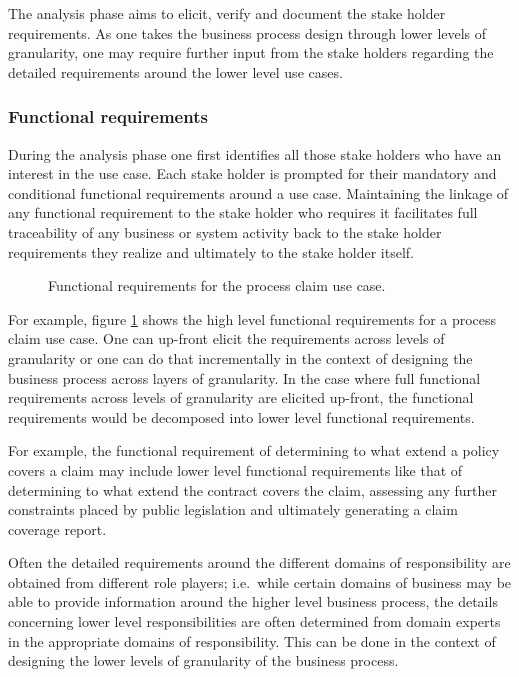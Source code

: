 \documentclass{IOS-Book-Article}
\begin{document}
The analysis phase aims to elicit, verify and document the stake holder requirements. As one takes the business
process design through lower levels of granularity, one may require further input from the stake holders regarding
the detailed requirements around the lower level use cases.


\subsubsection{Functional requirements}

During the analysis phase one first identifies all those stake holders who have an interest in the use case.
Each stake holder is prompted for their mandatory and conditional functional requirements around a use case.
Maintaining the linkage of any functional requirement to the stake holder who requires it facilitates full traceability
of any business or system activity back to the stake holder requirements they realize and ultimately to the 
stake holder itself.

\begin{figure}[thb]
  \centering
  \caption{Functional requirements for the process claim use case.}
  \label{fig:processClaimUseCase}
\end{figure}

For example, figure \ref{fig:processClaimUseCase} shows the high level functional requirements for a process
claim use case. One can up-front elicit the requirements across levels of granularity or one can do that incrementally
in the context of designing the business process across layers of granularity. In the case where full 
functional requirements across levels of granularity are elicited up-front, the functional requirements would be
decomposed into lower level functional requirements. 

For example, the functional requirement of determining to what extend a policy covers a claim may include lower level
functional requirements like that of determining to what extend the contract covers the claim, assessing any
further constraints placed by public legislation and ultimately generating a claim coverage report. 

Often the detailed requirements around the different domains of responsibility are obtained from different role
players; i.e.\ while certain domains of business may be able to provide information around the higher level business
process, the details concerning lower level responsibilities are often determined from domain experts in the
appropriate domains of responsibility.
This can be done in the context of designing the lower levels of granularity of the business process.
\end{document}
